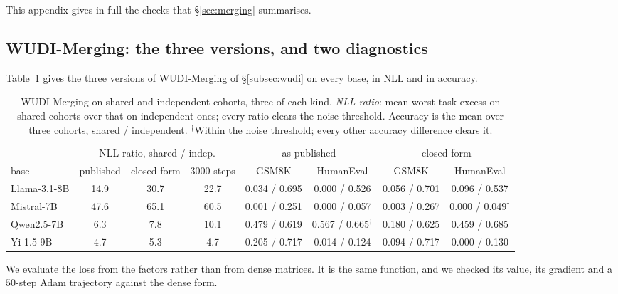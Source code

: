 
This appendix gives in full the checks that \S\ref{sec:merging} summarises.

\subsection{WUDI-Merging: the three versions, and two diagnostics}\label{app:wudi-diag}

Table~\ref{tab:wudi} gives the three versions of WUDI-Merging of
\S\ref{subsec:wudi} on every base, in NLL and in accuracy.

\begin{table}[pos=tbp]
\centering
\small
\caption{WUDI-Merging on shared and independent cohorts, three of each kind.
\emph{NLL ratio}: mean worst-task excess on shared cohorts over that on
independent ones; every ratio clears the noise threshold. Accuracy is the mean
over three cohorts, shared / independent. $^\dagger$Within the noise threshold;
every other accuracy difference clears it.}
\label{tab:wudi}
\setlength{\tabcolsep}{4pt}
\begin{tabular}{lccccccc}
\toprule
 & \multicolumn{3}{c}{NLL ratio, shared / indep.}
 & \multicolumn{2}{c}{as published}
 & \multicolumn{2}{c}{closed form} \\
\cmidrule(lr){2-4}\cmidrule(lr){5-6}\cmidrule(lr){7-8}
base & published & closed form & 3000 steps & GSM8K & HumanEval & GSM8K & HumanEval \\
\midrule
Llama-3.1-8B & 14.9 & 30.7 & 22.7 & 0.034 / 0.695 & 0.000 / 0.526 & 0.056 / 0.701 & 0.096 / 0.537 \\
Mistral-7B   & 47.6 & 65.1 & 60.5 & 0.001 / 0.251 & 0.000 / 0.057 & 0.003 / 0.267 & 0.000 / 0.049$^\dagger$ \\
Qwen2.5-7B   &  6.3 &  7.8 & 10.1 & 0.479 / 0.619 & 0.567 / 0.665$^\dagger$ & 0.180 / 0.625 & 0.459 / 0.685 \\
Yi-1.5-9B    &  4.7 &  5.3 &  4.7 & 0.205 / 0.717 & 0.014 / 0.124 & 0.094 / 0.717 & 0.000 / 0.130 \\
\bottomrule
\end{tabular}
\end{table}

We evaluate the loss from the
factors rather than from dense matrices. It is the same function, and we
checked its value, its gradient and a $50$-step Adam trajectory against the
dense form.


